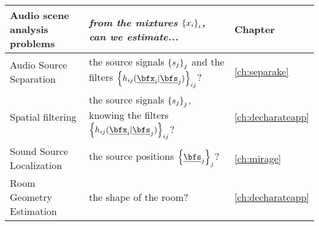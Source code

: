 \begin{tabular}{p{0.30\linewidth} p{0.60\linewidth} p{0.10\linewidth}}
    \toprule
    Audio scene analysis problems & \textit{from the mixtures $\setMicSignals$, can we estimate...}  & Chapter\\
    \midrule




    Audio Source Separation     & the source signals $\setSrcSignals$ and the filters $\setFltSignals$? & \cref{ch:separake}\\


    Spatial filtering           & the source signals $\setSrcSignals$, knowing the filters $\setFltSignals$? & \cref{ch:decharateapp}\\

    Sound Source Localization   & the source positions $\setSrcPositions$?                              & \cref{ch:mirage}\\

    Room Geometry Estimation    & the shape of the room?                                                & \cref{ch:decharateapp}\\
    \bottomrule
\end{tabular}